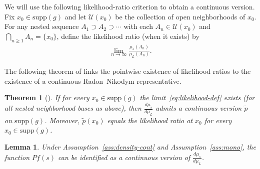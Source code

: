 \documentclass[12pt,leqno]{amsart}
\newtheorem{theorem}{Theorem}
\newtheorem{lemma}{Lemma}
\begin{document}
We will use the following likelihood-ratio criterion to obtain a continuous version.
Fix $x_0\in \mathrm{supp}(g)$ and let $\mathcal{U}(x_0)$ be the collection of open neighborhoods of $x_0$.
For any nested sequence $A_1\supset A_2\supset \cdots$ with each $A_n\in\mathcal{U}(x_0)$ and
$\bigcap_{n\ge1}A_n=\{x_0\}$, define the likelihood ratio (when it exists) by
\begin{align}
    \lim_{n\to\infty}\frac{\mu_s(A_n)}{\mu_L(A_n)}.
    \label{eq:likelihood-def}
\end{align}

The following theorem of \cite{piccioni1983continuous} links the pointwise existence of
likelihood ratios to the existence of a continuous Radon--Nikodym representative.

\begin{theorem}[\cite{piccioni1983continuous}]\label{thm:likelihood-ratio}
If for every $x_0\in \mathrm{supp}(g)$ the limit~\eqref{eq:likelihood-def} exists (for all nested neighborhood bases as above),
then $\frac{d\mu_s}{d\mu_L}$ admits a continuous version $\widetilde p$ on $\mathrm{supp}(g)$.
Moreover, $\widetilde p(x_0)$ equals the likelihood ratio at $x_0$ for every $x_0\in \mathrm{supp}(g)$.
\end{theorem}

\begin{lemma}\label{lem:pf-continuous-version}
Under Assumption~\ref{ass:density-cont} and Assumption~\ref{ass:mono},
the function $Pf(s)$ can be identified as a continuous version of $\frac{d\mu_s}{d\mu_L}$.
\end{lemma}
\end{document}
